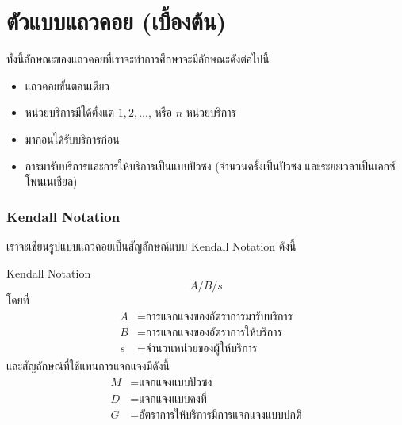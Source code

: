 \section{ตัวแบบแถวคอย (เบื้องต้น)}
ทั้งนี้ลักษณะของแถวคอยที่เราจะทำการศึกษาจะมีลักษณะดังต่อไปนี้
\begin{itemize}
	\item แถวคอยขั้นตอนเดียว
	\item หน่วยบริการมีได้ตั้งแต่ $1, 2, \dots$, หรือ $n$ หน่วยบริการ
	\item มาก่อนได้รับบริการก่อน
	\item การมารับบริการและการให้บริการเป็นแบบปัวซง (จำนวนครั้งเป็นปัวซง และระยะเวลาเป็นเอกซ์โพนเนเชียล)
\end{itemize}

\subsubsection{Kendall Notation}
เราจะเขียนรูปแบบแถวคอยเป็นสัญลักษณ์แบบ Kendall Notation ดังนี้
\begin{definition}
	{Kendall Notation}{}
	\[
	A/B/s
	\]
	โดยที่
	\begin{align*}
		A &= \text{การแจกแจงของอัตราการมารับบริการ}\\
		B &= \text{การแจกแจงของอัตราการให้บริการ}\\
		s &= \text{จำนวนหน่วยของผู้ให้บริการ}
	\end{align*}
	และสัญลักษณ์ที่ใช้แทนการแจกแจงมีดังนี้
	\begin{align*}
		M &= \text{แจกแจงแบบปัวซง}\\
		D &= \text{แจกแจงแบบคงที่}\\
		G &= \text{อัตราการให้บริการมีการแจกแจงแบบปกติ}
	\end{align*}
\end{definition}


